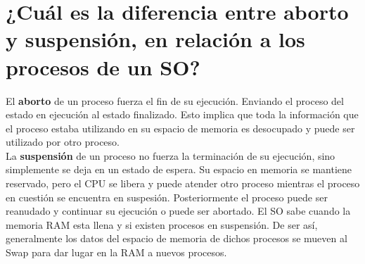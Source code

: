 \documentclass{article}
\begin{document}
\section{¿Cuál es la diferencia entre aborto y suspensión, en relación a los procesos de un SO?}
	El \textbf{aborto} de un proceso fuerza el fin de su ejecución. Enviando el proceso del estado en ejecución al estado finalizado. Esto implica que toda la información que el proceso estaba utilizando en su espacio de memoria es desocupado y puede ser utilizado por otro proceso.\\
	La \textbf{suspensión} de un proceso no fuerza la terminación de su ejecución, sino simplemente se deja en un estado de espera. Su espacio en memoria se mantiene reservado, pero el CPU se libera y puede atender otro proceso mientras el proceso en cuestión se encuentra en suspesión. Posteriormente el proceso puede ser reanudado y continuar su ejecución o puede ser abortado. El SO sabe cuando la memoria RAM esta llena y si existen procesos en suspensión. De ser así, generalmente los datos del espacio de memoria de dichos procesos se mueven al Swap para dar lugar en la RAM a nuevos procesos.
	
	
\end{document}
